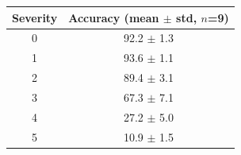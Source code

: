\begin{tabular}{cc}
\toprule
Severity & Accuracy (mean $\pm$ std, $n$=9) \\
\midrule
0 & 92.2 $\pm$ 1.3 \\
1 & 93.6 $\pm$ 1.1 \\
2 & 89.4 $\pm$ 3.1 \\
3 & 67.3 $\pm$ 7.1 \\
4 & 27.2 $\pm$ 5.0 \\
5 & 10.9 $\pm$ 1.5 \\
\bottomrule
\end{tabular}
